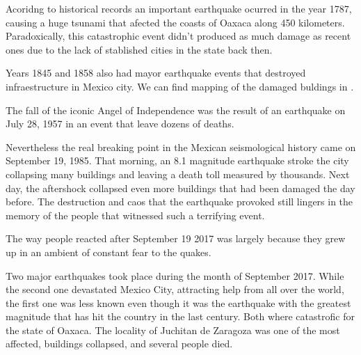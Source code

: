Acoridng to historical records an important earthquake ocurred in the year 1787, causing a huge tsunami that afected the coasts of Oaxaca along 450 kilometers. Paradoxically, this catastrophic event didn't produced as much damage as recent ones due to the lack of stablished cities in the state back then.

Years 1845 and 1858 also had mayor earthquake events that destroyed infraestructure in Mexico city. We can find mapping of the damaged buldings in \cite{AG3316}.

The fall of the iconic Angel of Independence was the result of an earthquake on July 28, 1957 in an event that leave dozens of deaths.

Nevertheless the real breaking point in the Mexican seismological history came on September 19, 1985. That morning, an 8.1 magnitude earthquake stroke the city collapsing many buildings and leaving a death toll measured by thousands. Next day, the aftershock collapsed even more buildings that had been damaged the day before. The destruction and caos that the earthquake provoked still lingers in the memory of the people that witnessed such a terrifying event.

The way people reacted after September 19 2017 was largely because they grew up in an ambient of constant fear to the quakes. 

Two major earthquakes took place during the month of September 2017. While the second one devastated Mexico City, attracting help from all over the world, the first one was less known even though it was the earthquake with the greatest magnitude that has hit the country in the last century. Both where catastrofic for the state of Oaxaca. The locality of Juchitan de Zaragoza was one of the most affected, buildings collapsed, and several people died.

